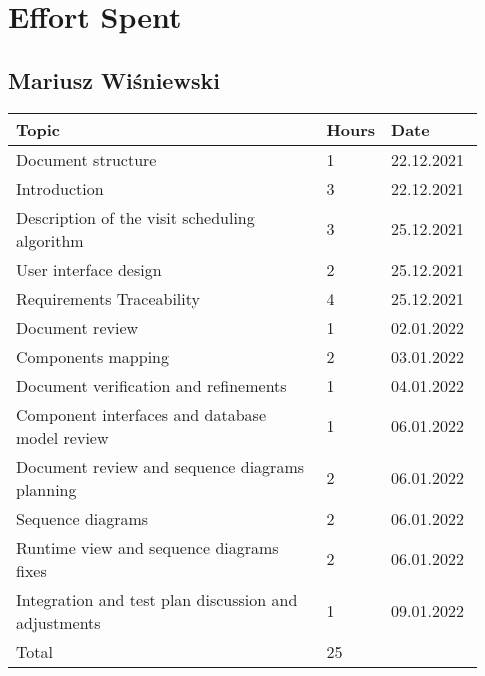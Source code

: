 \chapter{Effort Spent}

\section*{Mariusz Wiśniewski}
\begin{longtable}{@{}p{0.67\linewidth} p{0.06\linewidth} p{0.20\linewidth}@{}}
    \toprule[1.5pt]
    Topic & Hours & Date\\ \hline
    Document structure & 1 & 22.12.2021 \\ 
    Introduction & 3 & 22.12.2021 \\
    Description of the visit scheduling algorithm & 3 & 25.12.2021\\
    User interface design & 2 & 25.12.2021\\
    Requirements Traceability & 4 & 25.12.2021\\
    Document review & 1 & 02.01.2022\\
    Components mapping & 2 & 03.01.2022\\
    Document verification and refinements & 1 & 04.01.2022\\
    Component interfaces and database model review & 1 & 06.01.2022\\
    Document review and sequence diagrams planning & 2 & 06.01.2022\\
    Sequence diagrams & 2 & 06.01.2022\\
    Runtime view and sequence diagrams fixes & 2 & 06.01.2022\\
    Integration and test plan discussion and adjustments & 1 & 09.01.2022\\
    \hline
    Total & 25 &\\ 
    \bottomrule[1.5pt]
\end{longtable}


